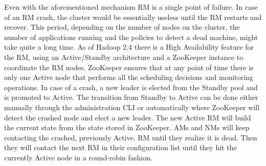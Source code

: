 Even with the aforementioned mechanism RM is a single point of
failure. In case of an RM crash, the cluster would be essentially useless until
the RM restarts and recover. This period, depending on the number of
nodes on the cluster, the number of applications running and the
policies to detect a dead machine, might take quite a long time. As of
Hadoop 2.4 there is a High Availability feature for the RM, using an
Active/Standby architecture and a ZooKeeper instance to coordinate
the RM nodes. ZooKeeper
ensures that at any point of time there is only one Active node that
performs all the scheduling decisions and monitoring operations. In case of a crash, a new leader is elected
from the Standby pool and is promoted to Active. The transition from
Standby to Active can be done either manually through the administration
CLI or automatically where ZooKeeper will detect the crashed node and
elect a new leader. The new Active RM will build the current state
from the state stored in ZooKeeper. AMs and NMs will keep contacting
the crashed, previously Active, RM until they realize it is dead. Then
they will contact the next RM in their configuration list until they
hit the currently Active node in a round-robin fashion.